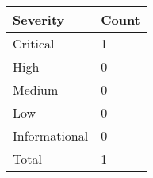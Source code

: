 \documentclass{article}
\begin{document}
                \begin{minipage}{.40\textwidth}
                \renewcommand{\arraystretch}{1.63}
                \begin{tabular}{|p{11em}|>{\centering\arraybackslash}p{6em}|}
                \hline
                \normalsize \cellcolor{black!10} \textbf{Severity} & \normalsize \cellcolor{black!10} \rule{0pt}{5ex} \textbf{Count} \\
                 \hline
                 \normalsize Critical &   \normalsize \cellcolor{critical} 1  \\
                 \hline
                 \normalsize High & \normalsize \cellcolor{high}  0 \\
                 \hline
                 \normalsize Medium & \normalsize \cellcolor{medium}  0 \\
                 \hline
                 \normalsize Low & \normalsize \cellcolor{low}  0 \\
                 \hline
                 \normalsize Informational & \normalsize \cellcolor{info} 0 \\
                 \hline
                 \normalsize Total & \normalsize \cellcolor{total} \rule{0pt}{4ex} 1 \\
                 \hline    
                \end{tabular}
                \end{minipage}

 

            \newpage
\end{document}
